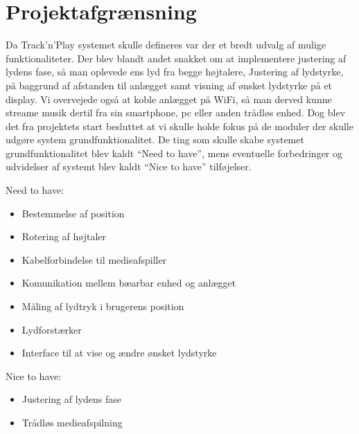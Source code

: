 \chapter{Projektafgrænsning}
\label{chap:afgraensning}

Da Track'n'Play systemet skulle defineres var der et bredt udvalg af mulige funktionaliteter. Der blev blandt andet snakket om at implementere justering af lydens fase, så man oplevede ens lyd fra begge højtalere, Justering af lydstyrke, på baggrund af afstanden til anlægget samt visning af ønsket lydstyrke på et display. Vi overvejede også at koble anlægget på WiFi, så man derved kunne streame musik dertil fra sin smartphone, pc eller anden trådløs enhed.
Dog blev det fra projektets start besluttet at vi skulle holde fokus på de moduler der skulle udgøre system grundfunktionalitet. De ting som skulle skabe systemet grundfunktionalitet blev kaldt ``Need to have'', mens eventuelle forbedringer og udvidelser af systemt blev kaldt ``Nice to have'' tilføjelser. 

Need to have:
\begin{itemize}
\item Bestemmelse af position
\item Rotering af højtaler
\item Kabelforbindelse til medieafspiller
\item Komunikation mellem bæarbar enhed og anlægget
\item Måling af lydtryk i brugerens position
\item Lydforstærker
\item Interface til at vise og ændre ønsket lydstyrke
\end{itemize}
Nice to have:
\begin{itemize}
\item Justering af lydens fase
\item Trådløs medieafspilning
\end{itemize}
